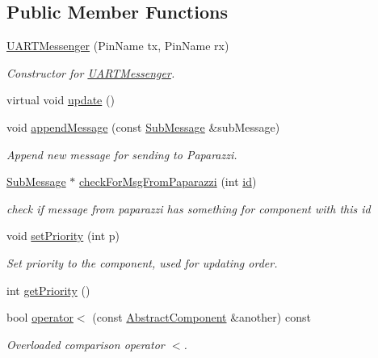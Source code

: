 \subsection*{Public Member Functions}
\begin{DoxyCompactItemize}
\item 
\hyperlink{class_u_a_r_t_messenger_a2fcc2d4308e961996cf3dd120f297112}{U\+A\+R\+T\+Messenger} (Pin\+Name tx, Pin\+Name rx)
\begin{DoxyCompactList}\small\item\em Constructor for \hyperlink{class_u_a_r_t_messenger}{U\+A\+R\+T\+Messenger}. \end{DoxyCompactList}\item 
virtual void \hyperlink{class_u_a_r_t_messenger_a7f2c3bdcf3a2b082e52815b97be37281}{update} ()
\item 
void \hyperlink{class_u_a_r_t_messenger_ada0967869e320c236a211b405abf128a}{append\+Message} (const \hyperlink{struct_sub_message}{Sub\+Message} \&sub\+Message)
\begin{DoxyCompactList}\small\item\em Append new message for sending to Paparazzi. \end{DoxyCompactList}\item 
\hyperlink{struct_sub_message}{Sub\+Message} $\ast$ \hyperlink{class_u_a_r_t_messenger_affb33ad31e70001505e14d02e1f8a018}{check\+For\+Msg\+From\+Paparazzi} (int \hyperlink{class_abstract_component_a9c9c548149681b1a1dd935e66ed5dd11}{id})
\begin{DoxyCompactList}\small\item\em check if message from paparazzi has something for component with this id \end{DoxyCompactList}\item 
void \hyperlink{class_abstract_component_a58a59a9ea6c3b4c86fb3bf98ff1eaaef}{set\+Priority} (int p)
\begin{DoxyCompactList}\small\item\em Set priority to the component, used for updating order. \end{DoxyCompactList}\item 
int \hyperlink{class_abstract_component_ac0b440d1d642ff1292ec3c544d75a8f1}{get\+Priority} ()
\item 
bool \hyperlink{class_abstract_component_a0c2e458144111c5f599c66f168516abc}{operator$<$} (const \hyperlink{class_abstract_component}{Abstract\+Component} \&another) const
\begin{DoxyCompactList}\small\item\em Overloaded comparison operator \textquotesingle{}$<$\textquotesingle{}. \end{DoxyCompactList}\end{DoxyCompactItemize}
